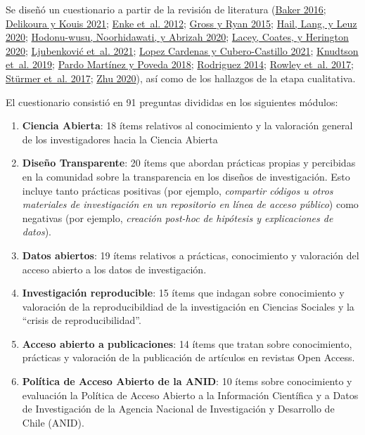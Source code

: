 \documentclass[
  letterpaper,
  DIV=11,
  numbers=noendperiod]{scrreprt}
\begin{document}
Se diseñó un cuestionario a partir de la revisión de literatura
(\protect\hyperlink{ref-baker_500_2016}{Baker 2016};
\protect\hyperlink{ref-delikoura_open_2021}{Delikoura y Kouis 2021};
\protect\hyperlink{ref-enke_user_2012}{Enke et~al. 2012};
\protect\hyperlink{ref-gross_landscapes_2015}{Gross y Ryan 2015};
\protect\hyperlink{ref-hail_reproducibility_2020}{Hail, Lang, y Leuz
2020}; \protect\hyperlink{ref-hodonu-wusu_malasyan_2020}{Hodonu-wusu,
Noorhidawati, y Abrizah 2020};
\protect\hyperlink{ref-lacey_open_2020}{Lacey, Coates, y Herington
2020}; \protect\hyperlink{ref-ljubenkovic_survey_2021}{Ljubenković
et~al. 2021};
\protect\hyperlink{ref-lopezcardenas_percepciones_2021}{Lopez Cardenas y
Cubero-Castillo 2021};
\protect\hyperlink{ref-knudtson_survey_2019}{Knudtson et~al. 2019};
\protect\hyperlink{ref-pardomartinez_knowledge_2018}{Pardo Martínez y
Poveda 2018}; \protect\hyperlink{ref-rodriguez_awareness_2014}{Rodriguez
2014}; \protect\hyperlink{ref-rowley_academics_2017}{Rowley et~al.
2017}; \protect\hyperlink{ref-sturmer_earlycareer_2017}{Stürmer et~al.
2017}; \protect\hyperlink{ref-zhu_openaccess_2020}{Zhu 2020}), así como
de los hallazgos de la etapa cualitativa.

El cuestionario consistió en 91 preguntas divididas en los siguientes
módulos:

\begin{enumerate}
\def\labelenumi{\arabic{enumi})}
\item
  \textbf{Ciencia Abierta}: 18 ítems relativos al conocimiento y la
  valoración general de los investigadores hacia la Ciencia Abierta
\item
  \textbf{Diseño Transparente}: 20 ítems que abordan prácticas propias y
  percibidas en la comunidad sobre la transparencia en los diseños de
  investigación. Esto incluye tanto prácticas positivas (por ejemplo,
  \emph{compartir códigos u otros materiales de investigación en un
  repositorio en línea de acceso público}) como negativas (por ejemplo,
  \emph{creación post-hoc de hipótesis y explicaciones de datos}).
\item
  \textbf{Datos abiertos}: 19 ítems relativos a prácticas, conocimiento
  y valoración del acceso abierto a los datos de investigación.
\item
  \textbf{Investigación reproducible}: 15 ítems que indagan sobre
  conocimiento y valoración de la reproducibildiad de la investigación
  en Ciencias Sociales y la ``crisis de reproducibilidad''.
\item
  \textbf{Acceso abierto a publicaciones}: 14 ítems que tratan sobre
  conocimiento, prácticas y valoración de la publicación de artículos en
  revistas Open Access.
\item
  \textbf{Política de Acceso Abierto de la ANID}: 10 ítems sobre
  conocimiento y evaluación la Política de Acceso Abierto a la
  Información Científica y a Datos de Investigación de la Agencia
  Nacional de Investigación y Desarrollo de Chile (ANID).
\end{enumerate}
\end{document}
